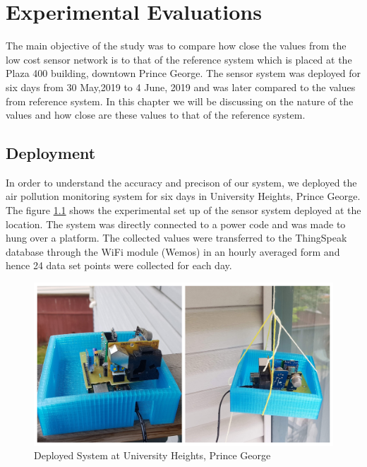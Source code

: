 \chapter{Experimental Evaluations}

The main objective of the study was to compare how close the values from the low cost sensor network is to that of the reference system which is placed at the Plaza 400 building, downtown Prince George. The sensor system was deployed for six days from 30 May,2019 to 4 June, 2019 and was later compared to the values from reference system. In this chapter we will be discussing on the nature of the values and how close are these values to that of the reference system.

\section{Deployment}

In order to understand the accuracy and precison of our system, we deployed the air pollution monitoring system for six days in University Heights, Prince George. The figure \ref{deployed} shows the experimental set up of the sensor system deployed at the location. The system was directly connected to a power code and was made to hung over a platform. The collected values were transferred to the ThingSpeak database through the WiFi module (Wemos) in an hourly averaged form and hence 24 data set points were collected for each day.

\begin{figure}[h]
    \begin{center}
    \includegraphics[scale=0.5]{images/figure20.jpg}
    \end{center}
    \caption{Deployed System at University Heights, Prince George}
    \label{deployed}

  \end{figure} 


